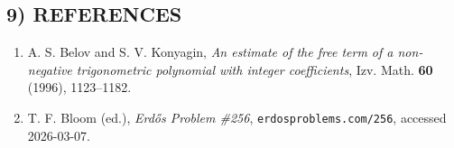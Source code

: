 \subsection*{9) REFERENCES}
\begin{enumerate}
\item A. S. Belov and S. V. Konyagin, \emph{An estimate of the free term of a non-negative trigonometric polynomial with integer coefficients}, Izv. Math. \textbf{60} (1996), 1123--1182.
\item T. F. Bloom (ed.), \emph{Erd\H{o}s Problem \#256}, \texttt{erdosproblems.com/256}, accessed 2026-03-07.
\end{enumerate}

